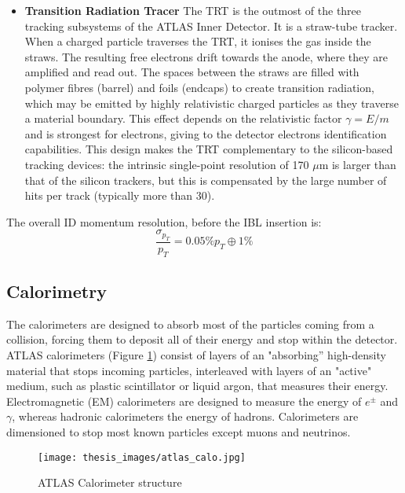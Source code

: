\documentclass[a4paper, oneside, 11pt, openright]{book}
\begin{document}
\begin{itemize}
					\item \textbf{Transition Radiation Tracer} 
						The TRT is the outmost of the three tracking subsystems of the ATLAS Inner Detector. It is a straw-tube tracker. When a charged particle traverses the TRT, it ionises the gas inside the straws. The resulting free electrons drift towards the anode, where they are amplified and read out. The spaces between the straws are filled with polymer fibres (barrel) and foils (endcaps) to create transition radiation, which may be emitted by highly relativistic charged particles as they traverse a material boundary. This effect depends on the relativistic factor $\gamma=E/m$ and is strongest for electrons, giving to the detector electrons identification capabilities. This design  makes the TRT complementary to  the silicon-based tracking devices:  the intrinsic single-point resolution of 170 $\mu$m is larger than that of the silicon trackers, but this is compensated by the large number of hits per track (typically more than 30). 
				\end{itemize}
				The overall ID momentum resolution, before the IBL insertion is:
				$$
				\frac{\sigma_{p_T}}{p_T} = 0.05\% p_T \oplus 1 \%
				$$
			\subsection{Calorimetry}
				The calorimeters are designed to absorb most of the particles coming from a collision, forcing them to deposit all of their energy and stop within the detector.  ATLAS calorimeters \cite{ATLAS_DESIGN_2008} (Figure \ref{fig:all_calo_struct}) consist of layers of an "absorbing” high-density material that stops incoming particles, interleaved with layers of an "active" medium, such as plastic scintillator or liquid argon, that measures their energy. Electromagnetic (EM) calorimeters are designed to measure the energy of $e^{\pm}$ and $\gamma$, whereas hadronic calorimeters the energy of hadrons. Calorimeters are dimensioned to stop most known particles except muons and neutrinos.
				\begin{figure}
					\centering
					\texttt{[image: thesis\_images/atlas\_calo.jpg]}
					\caption{ATLAS Calorimeter structure}
					\label{fig:all_calo_struct}
				\end{figure}
\end{document}
